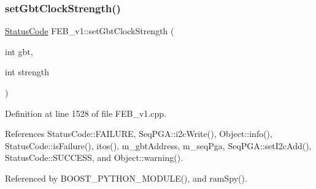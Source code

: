 \mbox{\label{classFEB__v1_a717d56186e6221cb20397cc3e496da50}} 
\subsubsection{\texorpdfstring{set\+Gbt\+Clock\+Strength()}{setGbtClockStrength()}}
{\footnotesize\ttfamily \hyperlink{classStatusCode}{Status\+Code} F\+E\+B\+\_\+v1\+::set\+Gbt\+Clock\+Strength (\begin{DoxyParamCaption}\item[{int}]{gbt,  }\item[{int}]{strength }\end{DoxyParamCaption})}



Definition at line 1528 of file F\+E\+B\+\_\+v1.\+cpp.



References Status\+Code\+::\+F\+A\+I\+L\+U\+RE, Seq\+P\+G\+A\+::i2c\+Write(), Object\+::info(), Status\+Code\+::is\+Failure(), itos(), m\+\_\+gbt\+Address, m\+\_\+seq\+Pga, Seq\+P\+G\+A\+::set\+I2c\+Add(), Status\+Code\+::\+S\+U\+C\+C\+E\+SS, and Object\+::warning().



Referenced by B\+O\+O\+S\+T\+\_\+\+P\+Y\+T\+H\+O\+N\+\_\+\+M\+O\+D\+U\+L\+E(), and ram\+Spy().



